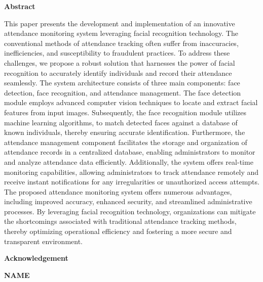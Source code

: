 \documentclass[12pt,a4paper]{report}
\begin{document}




\newpage
\noborders
\pagestyle{myfooters}
\begin{center}
	\Large{\textbf{Abstract}}
\end{center}
\par This paper presents the development and implementation of an innovative attendance monitoring system leveraging facial recognition technology. The conventional methods of attendance tracking often suffer from inaccuracies, inefficiencies, and susceptibility to fraudulent practices. To address these challenges, we propose a robust solution that harnesses the power of facial recognition to accurately identify individuals and record their attendance seamlessly. The system architecture consists of three main components: face detection, face recognition, and attendance management. The face detection module employs advanced computer vision techniques to locate and extract facial features from input images. Subsequently, the face recognition module utilizes machine learning algorithms, to match detected faces against a database of known individuals, thereby ensuring accurate identification. Furthermore, the attendance management component facilitates the storage and organization of attendance records in a centralized database, enabling administrators to monitor and analyze attendance data efficiently. Additionally, the system offers real-time monitoring capabilities, allowing administrators to track attendance remotely and receive instant notifications for any irregularities or unauthorized access attempts. The proposed attendance monitoring system offers numerous advantages, including improved accuracy, enhanced security, and streamlined administrative processes. By leveraging facial recognition technology, organizations can mitigate the shortcomings associated with traditional attendance tracking methods, thereby optimizing operational efficiency and fostering a more secure and transparent environment.

\newpage
\noborders
{}
\begin{center}
	\Large{\textbf{Acknowledgement}}
\end{center}
\begin{flushright}
	\textbf{NAME\\}
\end{flushright}
\end{document}

